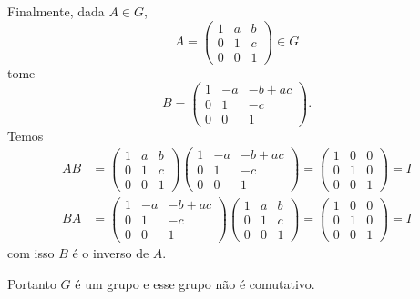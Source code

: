 \documentclass[12pt]{exam}
\begin{document}
    Finalmente, dada $A \in G$,
    \[
        A = \begin{pmatrix} 1 & a & b\\0 & 1 & c\\0 & 0 & 1\end{pmatrix} \in G
    \]
    tome
    \[
        B = \begin{pmatrix} 1 & -a & -b + ac\\0 & 1 & -c\\0 & 0 & 1\end{pmatrix}.
    \]
    Temos
    \begin{align*}
        AB &= \begin{pmatrix} 1 & a & b\\0 & 1 & c\\0 & 0 & 1\end{pmatrix} \begin{pmatrix} 1 & -a & -b + ac\\0 & 1 & -c\\0 & 0 & 1\end{pmatrix} = \begin{pmatrix} 1 & 0 & 0\\0 & 1 & 0\\0 & 0 & 1\end{pmatrix} = I\\
        BA &= \begin{pmatrix} 1 & -a & -b + ac\\0 & 1 & -c\\0 & 0 & 1\end{pmatrix}\begin{pmatrix} 1 & a & b\\0 & 1 & c\\0 & 0 & 1\end{pmatrix} = \begin{pmatrix} 1 & 0 & 0\\0 & 1 & 0\\0 & 0 & 1\end{pmatrix} = I
    \end{align*}
    com isso $B$ é o inverso de $A$.

    Portanto $G$ é um grupo e esse grupo não é comutativo.
\end{document}
